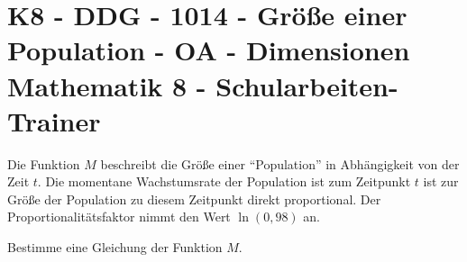 \section{K8 - DDG - 1014 - Größe einer Population - OA - Dimensionen Mathematik 8 - Schularbeiten-Trainer}

\begin{beispiel}[K8 - DDG]{1}
Die Funktion $M$ beschreibt die Größe einer "`Population"' in Abhängigkeit von der Zeit $t$. Die momentane Wachstumsrate der Population ist zum Zeitpunkt $t$ ist zur Größe der Population zu diesem Zeitpunkt direkt proportional. Der Proportionalitätsfaktor nimmt den Wert $\ln(0,98)$ an.

Bestimme eine Gleichung der Funktion $M$.

\end{beispiel}